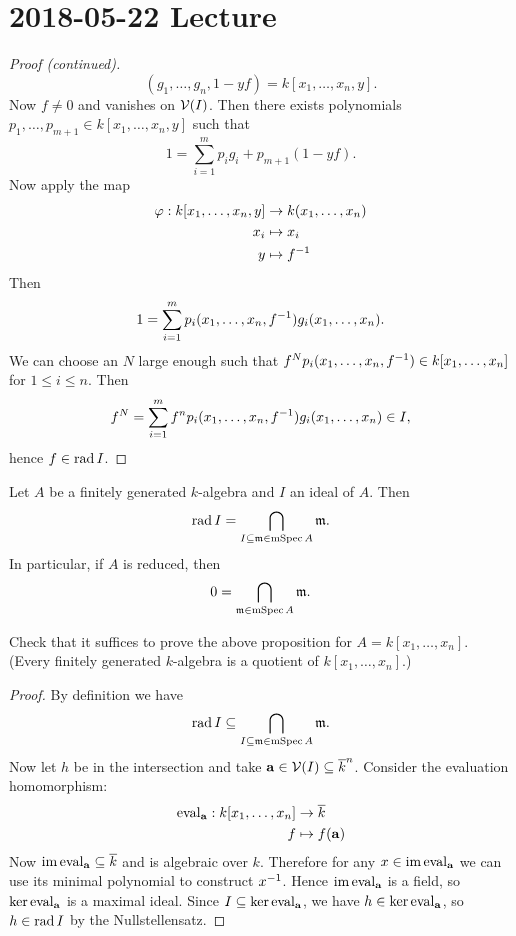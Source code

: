 \section{2018-05-22 Lecture}

\begin{proof}[Proof (continued)]
  \[ (g_1,\ldots,g_n,1-yf) = k[x_1,\ldots,x_n,y]. \]
  Now $f \neq 0$ and vanishes on $\mathcal{V}(I)$.
  Then there exists polynomials $p_1,\ldots,p_{m+1} \in k[x_1,\ldots,x_n,y]$ such that
  \[ 1 = \sum_{i=1}^m p_ig_i + p_{m+1}(1-yf). \]
  Now apply the map
  \begin{align*}
    \varphi: k[x_1,\ldots,x_n,y] &\to k(x_1,\ldots,x_n) \\
    x_i &\mapsto x_i \\
    y &\mapsto f^{-1}
  \end{align*}
  Then
  \[ 1 = \sum_{i=1}^m p_i(x_1,\ldots,x_n,f^{-1}) g_i(x_1,\ldots,x_n). \]
  We can choose an $N$ large enough such that $f^Np_i(x_1,\ldots,x_n,f^{-1}) \in k[x_1,\ldots,x_n]$ for $1 \leq i \leq n$.
  Then
  \[ f^N = \sum_{i=1}^m f^n p_i(x_1,\ldots,x_n,f^{-1}) g_i(x_1,\ldots,x_n) \in I, \]
  hence $f \in \operatorname{rad} I$.
\end{proof}

\begin{prop}[3.30]
  Let $A$ be a finitely generated $k$-algebra and $I$ an ideal of $A$.
  Then
  \[ \operatorname{rad} I = \bigcap_{I \subseteq \mathfrak{m} \in \operatorname{mSpec} A} \mathfrak{m}. \]
  In particular, if $A$ is reduced, then
  \[ 0 = \bigcap_{\mathfrak{m} \in \operatorname{mSpec} A} \mathfrak{m}. \]
\end{prop}

\begin{exer}
  Check that it suffices to prove the above proposition for $A=k[x_1,\ldots,x_n]$.
  (Every finitely generated $k$-algebra is a quotient of $k[x_1,\ldots,x_n]$.)
\end{exer}

\begin{proof}
  By definition we have
  \[ \operatorname{rad} I \subseteq \bigcap_{ I \subseteq \mathfrak{m} \in \operatorname{mSpec} A } \mathfrak{m}. \]
  Now let $h$ be in the intersection and take $\mathbf{a} \in \mathcal{V}(I) \subseteq \overline k^n$.
  Consider the evaluation homomorphism:
  \begin{align*}
    \operatorname{eval}_{\mathbf{a}}: k[x_1,\ldots,x_n] &\to \overline k \\
    f &\mapsto f(\mathbf{a})
  \end{align*}
  Now $\operatorname{im} \operatorname{eval}_{\mathbf{a}} \subseteq \overline k$ and is algebraic over $k$.
  Therefore for any $x \in \operatorname{im}\operatorname{eval}_{\mathbf{a}}$ we can use its minimal polynomial to construct $x^{-1}$.
  Hence $\operatorname{im} \operatorname{eval}_{\mathbf{a}}$ is a field, so $\ker\operatorname{eval}_{\mathbf{a}}$ is a maximal ideal.
  Since $I \subseteq \ker\operatorname{eval}_{\mathbf{a}}$, we have $h \in \ker\operatorname{eval}_{\mathbf{a}}$, so $h \in \operatorname{rad} I$ by the Nullstellensatz.
\end{proof}

